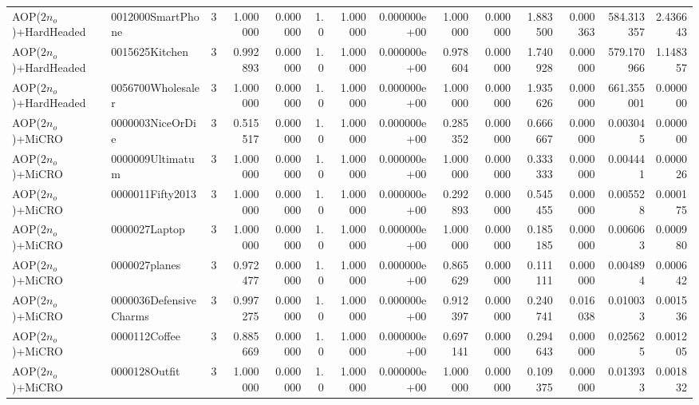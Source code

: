 \begin{tabular}{llrr|r|rr|rr|rr|rrr}
  AOP($2 n_o$)+HardHeaded &      0012000SmartPhone &       3 & 1.000000 & 0.000000 &  1.0 &      1.000000 & 0.000000e+00 &      1.000000 & 0.000000 &      1.883500 &    0.000363 &   584.313357 &    2.436643 \\
  AOP($2 n_o$)+HardHeaded &         0015625Kitchen &       3 & 0.992893 & 0.000000 &  1.0 &      1.000000 & 0.000000e+00 &      0.978604 & 0.000000 &      1.740928 &    0.000000 &   579.170966 &    1.148357 \\
  AOP($2 n_o$)+HardHeaded &      0056700Wholesaler &       3 & 1.000000 & 0.000000 &  1.0 &      1.000000 & 0.000000e+00 &      1.000000 & 0.000000 &      1.935626 &    0.000000 &   661.355001 &    0.000000 \\
       AOP($2 n_o$)+MiCRO &       0000003NiceOrDie &       3 & 0.515517 & 0.000000 &  1.0 &      1.000000 & 0.000000e+00 &      0.285352 & 0.000000 &      0.666667 &    0.000000 &     0.003045 &    0.000000 \\
       AOP($2 n_o$)+MiCRO &       0000009Ultimatum &       3 & 1.000000 & 0.000000 &  1.0 &      1.000000 & 0.000000e+00 &      1.000000 & 0.000000 &      0.333333 &    0.000000 &     0.004441 &    0.000026 \\
       AOP($2 n_o$)+MiCRO &       0000011Fifty2013 &       3 & 1.000000 & 0.000000 &  1.0 &      1.000000 & 0.000000e+00 &      0.292893 & 0.000000 &      0.545455 &    0.000000 &     0.005528 &    0.000175 \\
       AOP($2 n_o$)+MiCRO &          0000027Laptop &       3 & 1.000000 & 0.000000 &  1.0 &      1.000000 & 0.000000e+00 &      1.000000 & 0.000000 &      0.185185 &    0.000000 &     0.006063 &    0.000980 \\
       AOP($2 n_o$)+MiCRO &          0000027planes &       3 & 0.972477 & 0.000000 &  1.0 &      1.000000 & 0.000000e+00 &      0.865629 & 0.000000 &      0.111111 &    0.000000 &     0.004894 &    0.000642 \\
       AOP($2 n_o$)+MiCRO & 0000036DefensiveCharms &       3 & 0.997275 & 0.000000 &  1.0 &      1.000000 & 0.000000e+00 &      0.912397 & 0.000000 &      0.240741 &    0.016038 &     0.010033 &    0.001536 \\
       AOP($2 n_o$)+MiCRO &          0000112Coffee &       3 & 0.885669 & 0.000000 &  1.0 &      1.000000 & 0.000000e+00 &      0.697141 & 0.000000 &      0.294643 &    0.000000 &     0.025625 &    0.001205 \\
       AOP($2 n_o$)+MiCRO &          0000128Outfit &       3 & 1.000000 & 0.000000 &  1.0 &      1.000000 & 0.000000e+00 &      1.000000 & 0.000000 &      0.109375 &    0.000000 &     0.013933 &    0.001832 \\

\end{tabular}
